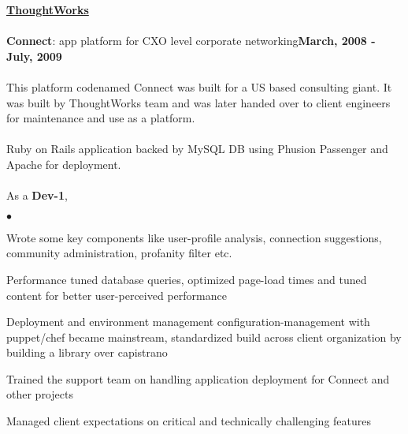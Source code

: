 \documentclass[margin,line]{res}
\newenvironment{list2}{
  \begin{list}{$\bullet$}{%
      \setlength{\itemsep}{0in}
      \setlength{\parsep}{0in} \setlength{\parskip}{0in}
      \setlength{\topsep}{0in} \setlength{\partopsep}{0in} 
      \setlength{\leftmargin}{0.2in}}}{\end{list}}
\begin{document}
\begin{resume}
{\underline {\bf ThoughtWorks}}\\
\\
{\bf Connect}: app platform for CXO level corporate networking\hfill {\bf March, 2008 - July, 2009}\\
\vspace{-.2cm}\\
This platform codenamed Connect was built for a US based consulting giant. It was built by ThoughtWorks team and was later handed over to client engineers for maintenance and use as a platform.\\
\\
Ruby on Rails application backed by MySQL DB using Phusion Passenger and Apache for deployment.\\
\\
As a {\bf Dev-1},
\begin{list2}
\item Wrote some key components like user-profile analysis, connection suggestions, community administration, profanity filter etc.
\item Performance tuned database queries, optimized page-load times and tuned content for better user-perceived performance
\item Deployment and environment management configuration-management with puppet/chef became mainstream, standardized build across client organization by building a library over capistrano
\item Trained the support team on handling application deployment for Connect and other projects
\item Managed client expectations on critical and technically challenging features
\end{list2}


\end{resume}
\end{document}
